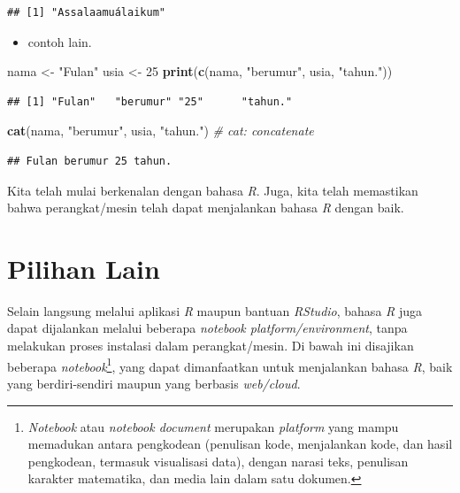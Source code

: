 \documentclass[
  12pt,
  a4paper,
]{scrbook}
\newenvironment{Shaded}{\begin{snugshade}}{\end{snugshade}}
\newcommand{\CommentTok}[1]{\textcolor[rgb]{0.56,0.35,0.01}{\textit{#1}}}
\newcommand{\DecValTok}[1]{\textcolor[rgb]{0.00,0.00,0.81}{#1}}
\newcommand{\KeywordTok}[1]{\textcolor[rgb]{0.13,0.29,0.53}{\textbf{#1}}}
\newcommand{\NormalTok}[1]{#1}
\newcommand{\StringTok}[1]{\textcolor[rgb]{0.31,0.60,0.02}{#1}}
\providecommand{\tightlist}{%
  \setlength{\itemsep}{0pt}\setlength{\parskip}{0pt}}
\begin{document}
\begin{verbatim}
## [1] "Assalaamuálaikum"
\end{verbatim}

\begin{itemize}
\tightlist
\item
  contoh lain.
\end{itemize}

\begin{Shaded}
\begin{Highlighting}[]
\NormalTok{nama <-}\StringTok{ "Fulan"}
\NormalTok{usia <-}\StringTok{ }\DecValTok{25}
\KeywordTok{print}\NormalTok{(}\KeywordTok{c}\NormalTok{(nama, }\StringTok{"berumur"}\NormalTok{, usia, }\StringTok{"tahun."}\NormalTok{))}
\end{Highlighting}
\end{Shaded}

\begin{verbatim}
## [1] "Fulan"   "berumur" "25"      "tahun."
\end{verbatim}

\begin{Shaded}
\begin{Highlighting}[]
\KeywordTok{cat}\NormalTok{(nama, }\StringTok{"berumur"}\NormalTok{, usia, }\StringTok{"tahun."}\NormalTok{)  }\CommentTok{# cat: concatenate}
\end{Highlighting}
\end{Shaded}

\begin{verbatim}
## Fulan berumur 25 tahun.
\end{verbatim}

Kita telah mulai berkenalan dengan bahasa \emph{R}. Juga, kita telah
memastikan bahwa perangkat/mesin telah dapat menjalankan bahasa \emph{R}
dengan baik.

\hypertarget{pilihan-lain}{%
\section{Pilihan Lain}\label{pilihan-lain}}

Selain langsung melalui aplikasi \emph{R} maupun bantuan \emph{RStudio},
bahasa \emph{R} juga dapat dijalankan melalui beberapa \emph{notebook
platform/environment}, tanpa melakukan proses instalasi dalam
perangkat/mesin. Di bawah ini disajikan beberapa
\emph{notebook}\footnote{\emph{Notebook} atau \emph{notebook document}
  merupakan \emph{platform} yang mampu memadukan antara pengkodean
  (penulisan kode, menjalankan kode, dan hasil pengkodean, termasuk
  visualisasi data), dengan narasi teks, penulisan karakter matematika,
  dan media lain dalam satu dokumen.}, yang dapat dimanfaatkan untuk
menjalankan bahasa \emph{R}, baik yang berdiri-sendiri maupun yang
berbasis \emph{web/cloud}.
\end{document}

